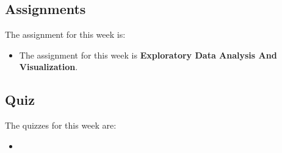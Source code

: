 \subsection{Assignments}

The assignment for this week is:

\begin{itemize}
    \item The assignment for this week is \textbf{Exploratory Data Analysis And Visualization}. 
\end{itemize}

\subsection{Quiz}

The quizzes for this week are:

\begin{itemize}
    \item {} \textbullet {} 
\end{itemize}